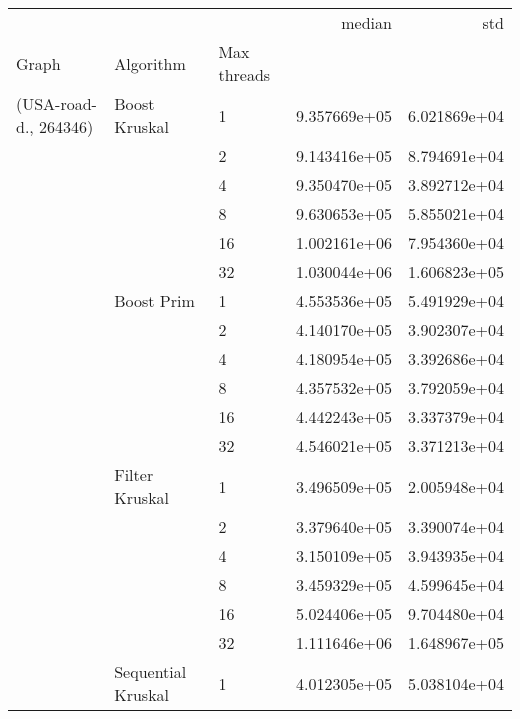 \begin{tabular}{lllrr}
\toprule
                       &                    &    &        median &           std \\
Graph & Algorithm & Max threads &               &               \\
\midrule
(USA-road-d., 264346) & Boost Kruskal & 1  &  9.357669e+05 &  6.021869e+04 \\
                       &                    & 2  &  9.143416e+05 &  8.794691e+04 \\
                       &                    & 4  &  9.350470e+05 &  3.892712e+04 \\
                       &                    & 8  &  9.630653e+05 &  5.855021e+04 \\
                       &                    & 16 &  1.002161e+06 &  7.954360e+04 \\
                       &                    & 32 &  1.030044e+06 &  1.606823e+05 \\
                       & Boost Prim & 1  &  4.553536e+05 &  5.491929e+04 \\
                       &                    & 2  &  4.140170e+05 &  3.902307e+04 \\
                       &                    & 4  &  4.180954e+05 &  3.392686e+04 \\
                       &                    & 8  &  4.357532e+05 &  3.792059e+04 \\
                       &                    & 16 &  4.442243e+05 &  3.337379e+04 \\
                       &                    & 32 &  4.546021e+05 &  3.371213e+04 \\
                       & Filter Kruskal & 1  &  3.496509e+05 &  2.005948e+04 \\
                       &                    & 2  &  3.379640e+05 &  3.390074e+04 \\
                       &                    & 4  &  3.150109e+05 &  3.943935e+04 \\
                       &                    & 8  &  3.459329e+05 &  4.599645e+04 \\
                       &                    & 16 &  5.024406e+05 &  9.704480e+04 \\
                       &                    & 32 &  1.111646e+06 &  1.648967e+05 \\
                       & Sequential Kruskal & 1  &  4.012305e+05 &  5.038104e+04 \\

\end{tabular}
